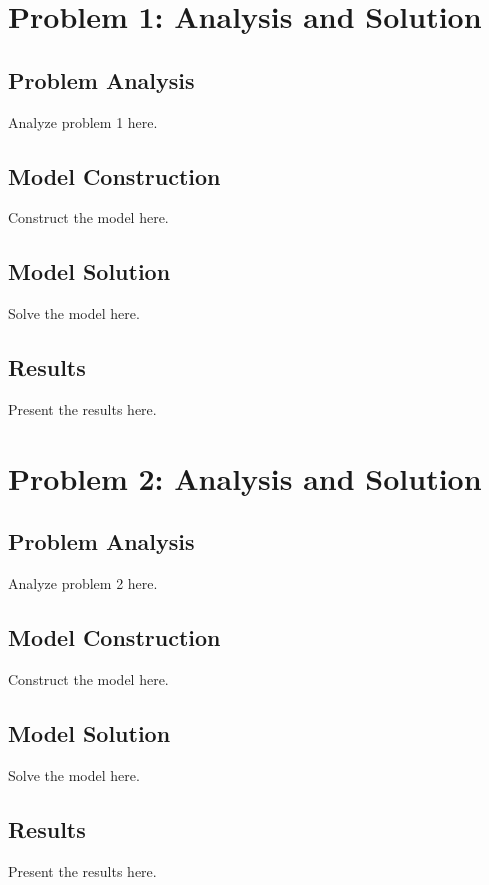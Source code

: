 \documentclass[mcmthesis]{mcmthesis}
\begin{document}
\section{Problem 1: Analysis and Solution}
\subsection{Problem Analysis}
Analyze problem 1 here.

\subsection{Model Construction}
Construct the model here.

\subsection{Model Solution}
Solve the model here.

\subsection{Results}
Present the results here.

\section{Problem 2: Analysis and Solution}
\subsection{Problem Analysis}
Analyze problem 2 here.

\subsection{Model Construction}
Construct the model here.

\subsection{Model Solution}
Solve the model here.

\subsection{Results}
Present the results here.

\end{document}
